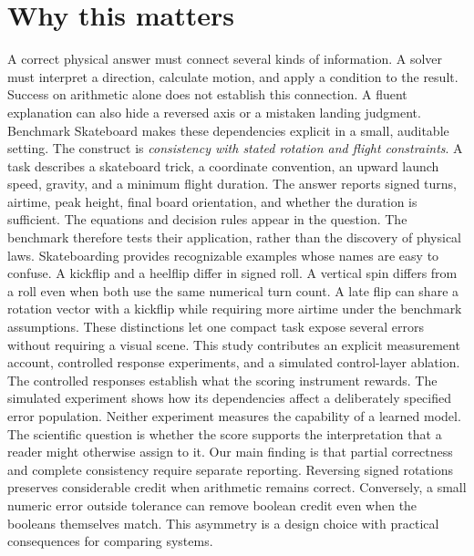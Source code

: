 \documentclass{article}
\title{\PaperTitle}
\author{Pooria Arab\\Independent researcher\\ORCID: \AuthorOrcid}
\begin{document}
\maketitle
\begin{abstract}\PaperAbstract\end{abstract}
\section{Why this matters}
A correct physical answer must connect several kinds of information. A solver must interpret a direction, calculate motion, and apply a condition to the result. Success on arithmetic alone does not establish this connection. A fluent explanation can also hide a reversed axis or a mistaken landing judgment. Benchmark Skateboard makes these dependencies explicit in a small, auditable setting.
The construct is \emph{consistency with stated rotation and flight constraints}. A task describes a skateboard trick, a coordinate convention, an upward launch speed, gravity, and a minimum flight duration. The answer reports signed turns, airtime, peak height, final board orientation, and whether the duration is sufficient. The equations and decision rules appear in the question. The benchmark therefore tests their application, rather than the discovery of physical laws.
Skateboarding provides recognizable examples whose names are easy to confuse. A kickflip and a heelflip differ in signed roll. A vertical spin differs from a roll even when both use the same numerical turn count. A late flip can share a rotation vector with a kickflip while requiring more airtime under the benchmark assumptions. These distinctions let one compact task expose several errors without requiring a visual scene.
This study contributes an explicit measurement account, controlled response experiments, and a simulated control-layer ablation. The controlled responses establish what the scoring instrument rewards. The simulated experiment shows how its dependencies affect a deliberately specified error population. Neither experiment measures the capability of a learned model. The scientific question is whether the score supports the interpretation that a reader might otherwise assign to it.
Our main finding is that partial correctness and complete consistency require separate reporting. Reversing signed rotations preserves considerable credit when arithmetic remains correct. Conversely, a small numeric error outside tolerance can remove boolean credit even when the booleans themselves match. This asymmetry is a design choice with practical consequences for comparing systems.
\end{document}
